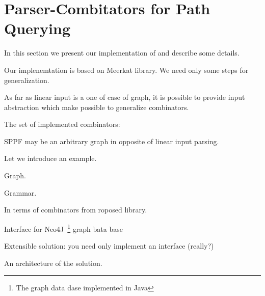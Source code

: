 \section{Parser-Combitators for Path Querying}

In this section we present our implementation of and describe some details.

Our implenemtation is based on Meerkat library. 
We need only some steps for generalization.

As far as linear input is a one of case of graph, it is possible to provide input abstraction which 
make possible to generalize combinators.

The set of implemented combinators:

SPPF may be an arbitrary graph in opposite of linear input parsing.

Let we introduce an example. 

Graph.

Grammar.

In terms of combinators from roposed library.

Interface for Neo4J~\footnote{The graph data dase implemented in Java} graph bata base

Extensible solution: you need only implement an interface (really?)

An architecture of the solution.
